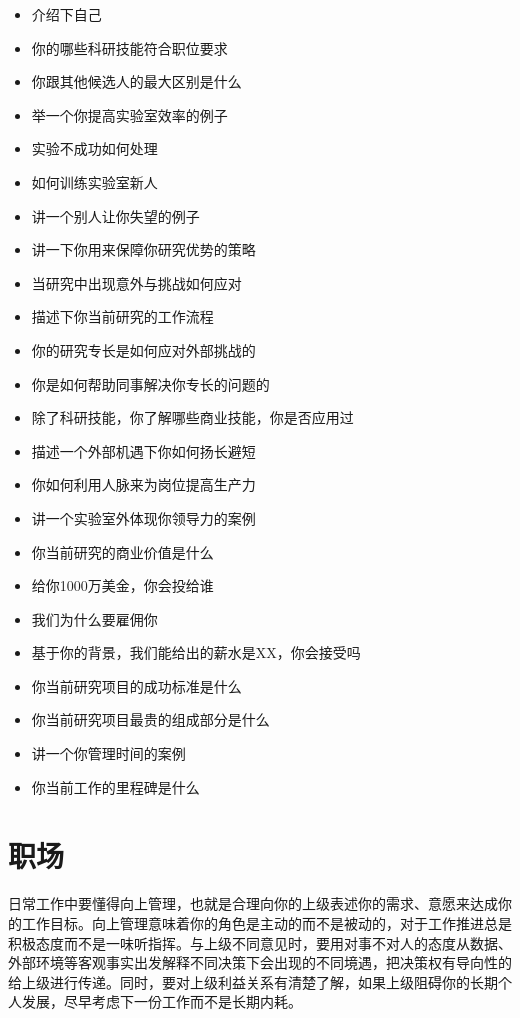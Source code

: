 \documentclass[]{tufte-book}
\providecommand{\tightlist}{%
  \setlength{\itemsep}{0pt}\setlength{\parskip}{0pt}}
\begin{document}
\begin{itemize}
\tightlist
\item
  介绍下自己
\item
  你的哪些科研技能符合职位要求
\item
  你跟其他候选人的最大区别是什么
\item
  举一个你提高实验室效率的例子
\item
  实验不成功如何处理
\item
  如何训练实验室新人
\item
  讲一个别人让你失望的例子
\item
  讲一下你用来保障你研究优势的策略
\item
  当研究中出现意外与挑战如何应对
\item
  描述下你当前研究的工作流程
\item
  你的研究专长是如何应对外部挑战的
\item
  你是如何帮助同事解决你专长的问题的
\item
  除了科研技能，你了解哪些商业技能，你是否应用过
\item
  描述一个外部机遇下你如何扬长避短
\item
  你如何利用人脉来为岗位提高生产力
\item
  讲一个实验室外体现你领导力的案例
\item
  你当前研究的商业价值是什么
\item
  给你1000万美金，你会投给谁
\item
  我们为什么要雇佣你
\item
  基于你的背景，我们能给出的薪水是XX，你会接受吗
\item
  你当前研究项目的成功标准是什么
\item
  你当前研究项目最贵的组成部分是什么
\item
  讲一个你管理时间的案例
\item
  你当前工作的里程碑是什么
\end{itemize}

\hypertarget{ux804cux573a}{%
\section{职场}\label{ux804cux573a}}

日常工作中要懂得向上管理，也就是合理向你的上级表述你的需求、意愿来达成你的工作目标。向上管理意味着你的角色是主动的而不是被动的，对于工作推进总是积极态度而不是一味听指挥。与上级不同意见时，要用对事不对人的态度从数据、外部环境等客观事实出发解释不同决策下会出现的不同境遇，把决策权有导向性的给上级进行传递。同时，要对上级利益关系有清楚了解，如果上级阻碍你的长期个人发展，尽早考虑下一份工作而不是长期内耗。
\end{document}
